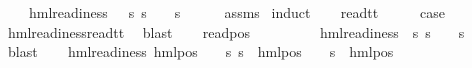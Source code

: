 \begin{isabellebody}
\ \ \ {\isachardoublequoteopen}{\isasymexists}{\isasympsi}{\isachardot}{\kern0pt}\ hml{\isacharunderscore}{\kern0pt}readiness\ {\isasympsi}\ {\isasymand}\ {\isacharparenleft}{\kern0pt}{\isasymforall}s{\isachardot}{\kern0pt}\ {\isacharparenleft}{\kern0pt}s\ {\isasymTurnstile}\ {\isasymphi}{\isacharparenright}{\kern0pt}\ {\isasymlongleftrightarrow}\ {\isacharparenleft}{\kern0pt}s\ {\isasymTurnstile}\ {\isasympsi}{\isacharparenright}{\kern0pt}{\isacharparenright}{\kern0pt}{\isachardoublequoteclose}\isanewline
%
\isadelimproof
\ \ %
\endisadelimproof
%
\isatagproof
{}\isamarkupfalse%
\ assms\ \isamarkupfalse%
{\isacharparenleft}{\kern0pt}induct{\isacharparenright}{\kern0pt}\isanewline
\ \ \isamarkupfalse%
\ read{\isacharunderscore}{\kern0pt}tt\isanewline
\ \ \isamarkupfalse%
\ \isamarkupfalse%
\ {\isacharquery}{\kern0pt}case\ \isanewline
\ \ \ \ \isamarkupfalse%
\ hml{\isacharunderscore}{\kern0pt}readiness{\isachardot}{\kern0pt}read{\isacharunderscore}{\kern0pt}tt\ \isamarkupfalse%
\ blast\isanewline
{}\isamarkupfalse%
\isanewline
\ \ \isamarkupfalse%
\ {\isacharparenleft}{\kern0pt}read{\isacharunderscore}{\kern0pt}pos\ {\isasymphi}\ {\isasymalpha}{\isacharparenright}{\kern0pt}\isanewline
\ \ \isamarkupfalse%
\ \isamarkupfalse%
\ {\isasympsi}\ \ {\isachardoublequoteopen}hml{\isacharunderscore}{\kern0pt}readiness\ {\isasympsi}{\isachardoublequoteclose}\ {\isachardoublequoteopen}{\isacharparenleft}{\kern0pt}{\isasymforall}s{\isachardot}{\kern0pt}\ {\isacharparenleft}{\kern0pt}s\ {\isasymTurnstile}\ {\isasymphi}{\isacharparenright}{\kern0pt}\ {\isacharequal}{\kern0pt}\ {\isacharparenleft}{\kern0pt}s\ {\isasymTurnstile}\ {\isasympsi}{\isacharparenright}{\kern0pt}{\isacharparenright}{\kern0pt}{\isachardoublequoteclose}\ \isamarkupfalse%
\ blast\isanewline
\ \ \isamarkupfalse%
\ {\isachardoublequoteopen}hml{\isacharunderscore}{\kern0pt}readiness\ {\isacharparenleft}{\kern0pt}hml{\isacharunderscore}{\kern0pt}pos\ {\isasymalpha}\ {\isasympsi}{\isacharparenright}{\kern0pt}\ {\isasymand}\ {\isacharparenleft}{\kern0pt}{\isasymforall}s{\isachardot}{\kern0pt}\ {\isacharparenleft}{\kern0pt}s\ {\isasymTurnstile}\ hml{\isacharunderscore}{\kern0pt}pos\ {\isasymalpha}\ {\isasymphi}{\isacharparenright}{\kern0pt}\ {\isacharequal}{\kern0pt}\ {\isacharparenleft}{\kern0pt}s\ {\isasymTurnstile}\ {\isacharparenleft}{\kern0pt}hml{\isacharunderscore}{\kern0pt}pos\ {\isasymalpha}\ {\isasympsi}{\isacharparenright}{\kern0pt}{\isacharparenright}{\kern0pt}{\isacharparenright}{\kern0pt}{\isachardoublequoteclose}\isanewline

\end{isabellebody}
